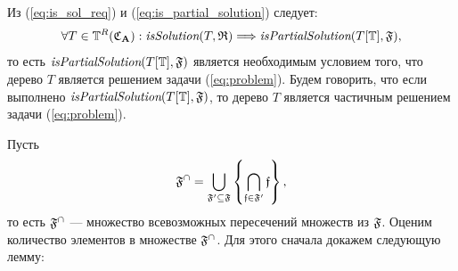 Из (\ref{eq:is_sol_req}) и (\ref{eq:is_partial_solution}) следует:
\begin{equation}\label{eq:is_sol_req_2}
\forall T \in \mathbb{T}^R(\mathfrak{C}_{\mathbf{A}}): \textit{isSolution}(T, \mathfrak{R}) \Longrightarrow \textit{isPartialSolution}(T[\mathbb{T}], \mathfrak{F}) \text{,}
\end{equation}
то есть $\textit{isPartialSolution}(T[\mathbb{T}], \mathfrak{F})$ является необходимым условием того, что дерево $T$ является решением задачи (\ref{eq:problem}). Будем говорить, что если выполнено $\textit{isPartialSolution}(T[\mathbb{T}], \mathfrak{F})$, то дерево $T$ является частичным решением задачи (\ref{eq:problem}).

Пусть
\begin{equation}\label{eq:f_closure_def}
\mathfrak{F}^{\cap} = \bigcup_{\mathfrak{F}' \subseteq \mathfrak{F}} \left\{ \bigcap_{\mathfrak{f} \in \mathfrak{F}'} \mathfrak{f} \right\} \text{,}
\end{equation}
то есть $\mathfrak{F}^{\cap}$ --- множество всевозможных пересечений множеств из $\mathfrak{F}$. Оценим количество элементов в множестве $\mathfrak{F}^{\cap}$. Для этого сначала докажем следующую лемму:



